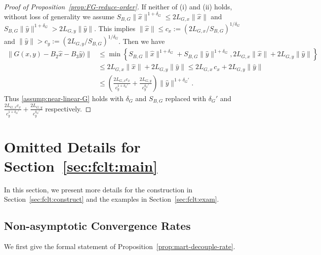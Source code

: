 \documentclass[11pt]{article}
\theoremstyle{plain}
\theoremstyle{definition}
\def\LGx{{L}_{G,x}}
\def\LGy{{L}_{G,y}}
\def\Gsmooth{{\delta_G}}
\def\SBG{{S}_{B,G}}
\newcommand{\xhat}{{\hat{x}}}
\newcommand{\yhat}{{\hat{y}}}
\newcommand{\xx}{{x}}
\newcommand{\yy}{{y}}
\begin{document}
\begin{appendix}
\begin{proof}[Proof of Proposition~\ref{prop:FG-reduce-order}]
If neither of (i) and (ii) holds, without loss of generality we assume $ \SBG \| \xhat \|^{1+\Gsmooth} \le 2 \LGx \| \xhat \| $ and $\SBG \| 
\yhat \|^{1+\Gsmooth} > 2 \LGy \| \yhat \| $.
This implies $ \| \xhat \| \le c_x := (2 \LGx / \SBG)^{1/\Gsmooth}  $ and $\| \yhat \| > c_y := ( 2 \LGy / \SBG )^{1/\Gsmooth}$.
Then we have 
\begin{align*}
    \| G(\xx, \yy) - B_2 \xhat - B_3 \yhat ) \|
    & \le \min \left\{ \SBG \| \xhat \|^{1+\Gsmooth} + \SBG \| \yhat \|^{1+\Gsmooth}, 2 \LGx \| \xhat \| + 2 \LGy \| \yhat \| \right\} \\
    & \le 2 \LGx \| \xhat \| + 2 \LGy \| \yhat \| 
    \le  2 \LGx\, c_x + 2 \LGy \| \yhat \| \\
    & \le \left( \frac{2 \LGx c_x}{ c_y^{1+\Gsmooth'} } + \frac{2 \LGy}{c_y^{\Gsmooth'}} \right) \| \yhat \|^{1+\Gsmooth'}.
\end{align*}
Thus \eqref{assump:near-linear-G} holds with $\Gsmooth$ and $\SBG$ replaced with $\Gsmooth'$ and $\frac{2 \LGx c_x}{ c_y^{1+\Gsmooth'} } + \frac{2 \LGy}{c_y^{\Gsmooth'}}$ respectively.
\end{proof}



\section{Omitted Details for Section~\ref{sec:fclt:main}}\label{append:construct}
In this section, we present more details for the construction in Section~\ref{sec:fclt:construct} and the examples in Section~\ref{sec:fclt:exam}.

\subsection{Non-asymptotic Convergence Rates}\label{append:construct-non-asymp}
We first give the formal statement of Proposition~\ref{prop:mart-decouple-rate}.


\end{appendix}
\end{document}
